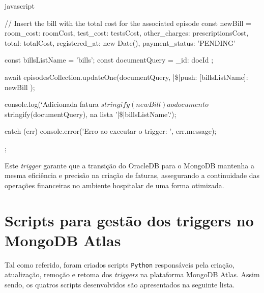 \begin{myminted}{javascript}
{{        // Insert the bill with the total cost for the associated episode
        const newBill = {
          room_cost: roomCost,
          test_cost: testsCost,
          other_charges: prescriptionsCost,
          total: totalCost,
          registered_at: new Date(),
          payment_status: 'PENDING'
        }

        const billsListName = 'bills';
        const documentQuery = { _id: docId };

        await episodesCollection.updateOne(documentQuery, { |\$|push: { [billsListName]: newBill } });
        
        console.log(`Adicionada fatura ${stringify(newBill)} ao documento ${stringify(documentQuery)}, na lista '|\$|{billsListName}'.`);

    } catch (err) {
        console.error('Erro ao executar o trigger: ', err.message);
    }
};
\end{myminted}


Este \textit{trigger} garante que a transição do OracleDB para o MongoDB mantenha a mesma eficiência e precisão na criação de faturas, assegurando a continuidade das operações financeiras no ambiente hospitalar de uma forma otimizada.

\section{Scripts para gestão dos triggers no MongoDB Atlas}
Tal como referido, foram criados scripts \texttt{Python} responsáveis pela criação, atualização, remoção e retoma dos \textit{triggers} na plataforma MongoDB Atlas. Assim sendo, os quatros scripts desenvolvidos são apresentados na seguinte lista.

